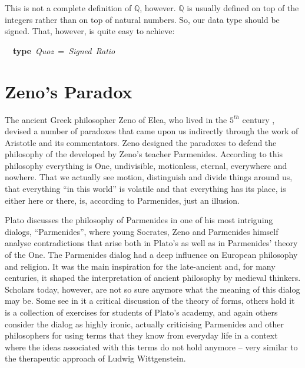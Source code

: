 \documentclass[tikz]{scrreprt}
\newcommand{\texfamily}{\fontfamily{cmtex}\selectfont}
\begin{document}
This is not a complete definition of $\mathbb{Q}$, however.
$\mathbb{Q}$ is usually defined on top of the integers
rather than on top of natural numbers.
So, our data type should be signed.
That, however, is quite easy to achieve:

\begin{minipage}{\textwidth}
\begin{tabbing}\texfamily
~~{\bfseries type}~{\itshape Quoz}~=~{\itshape Signed}~{\itshape Ratio}
\end{tabbing}
\end{minipage}


\section{Zeno's Paradox}
\ignore{
\begin{tabbing}\texfamily
{\bfseries module}~{\itshape Zeno}\\
\texfamily {\bfseries where}\\
\texfamily ~~{\bfseries import}~{\itshape Quoz}
\end{tabbing}
}

The ancient Greek philosopher Zeno of Elea, who lived
in the $5^{th}$ century , devised a number
of paradoxes that came upon us indirectly through
the work of Aristotle and its commentators.
Zeno designed the paradoxes to defend the philosophy
of the  developed by Zeno's teacher Parmenides.
According to this philosophy everything is One,
undivisible, motionless, eternal, everywhere and nowhere.
That we actually see motion, distinguish and divide
things around us, that everything ``in this world'' is volatile
and that everything has its place, is either here or there,
is, according to Parmenides, just an illusion.

Plato discusses the philosophy of Parmenides in one
of his most intriguing dialogs, ``Parmenides'', 
where young Socrates, Zeno and Parmenides himself
analyse contradictions that arise both in Plato's
 as well as in Parmenides' theory of the One.
The Parmenides dialog had a deep influence on 
European philosophy and religion. 
It was the main inspiration for the late-ancient
 and, for many centuries,
it shaped the interpretation of ancient philosophy
by medieval thinkers.
Scholars today, however, are not so sure anymore
what the meaning of this dialog may be.
Some see in it a critical discussion of 
the theory of forms, others hold it is a collection
of exercises for students of Plato's academy,
and again others consider the dialog as highly ironic,
actually criticising Parmenides and other philosophers
for using terms that they know from everyday life 
in a context where the ideas associated with this terms
do not hold anymore -- very similar to the therapeutic
approach of Ludwig Wittgenstein.
\end{document}
